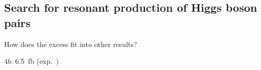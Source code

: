 \subsection{Search for resonant production of Higgs boson pairs}

How does the excess fit into other results?

$4b$: \SI{6.5}{\femto\barn} (exp.\ )



